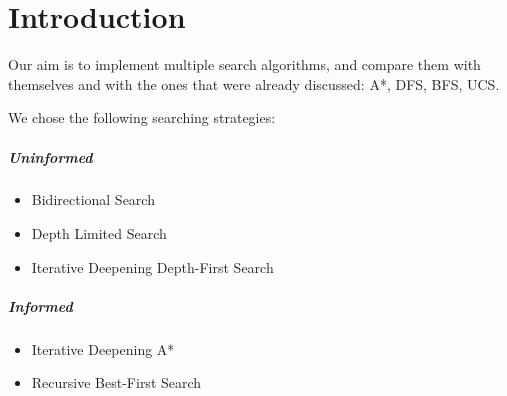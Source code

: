 \chapter{Introduction} 

Our aim is to implement multiple search algorithms, and compare them with themselves and with the ones that were already discussed: A*, DFS, BFS, UCS.

We chose the following searching strategies:

\paragraph{Uninformed}

\begin{itemize}

\item Bidirectional Search

\item Depth Limited Search

\item Iterative Deepening Depth-First Search

\end{itemize}

\paragraph{Informed}

\begin{itemize}

\item Iterative Deepening A*

\item Recursive Best-First Search

\end{itemize}
